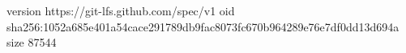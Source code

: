 version https://git-lfs.github.com/spec/v1
oid sha256:1052a685e401a54cace291789db9fac8073fc670b964289e76e7df0dd13d694a
size 87544
